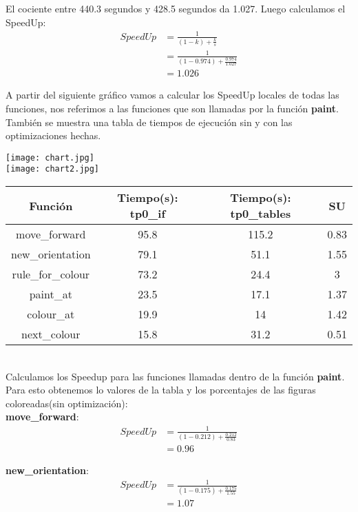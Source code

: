 \documentclass[a4paper, 10pt, twoside, notitlepage]{article}
\begin{document}
El cociente entre 440.3 segundos y 428.5 segundos da 1.027. Luego calculamos el SpeedUp:
\begin{equation*} 
\begin{split}
 SpeedUp & =\frac{1}{(1-k) + \frac{k}{s}} \\
  &=\frac{1}{(1-0.974) + \frac{0.974}{1.027}} \\
  &= 1.026
\end{split}
\end{equation*}


\newpage
A partir del siguiente gráfico vamos a calcular los SpeedUp locales de todas las funciones, nos referimos a las funciones que son llamadas por la función \textbf{paint}. También se muestra una tabla de tiempos de ejecución sin y con las optimizaciones hechas.

\texttt{[image: chart.jpg]} \\

\texttt{[image: chart2.jpg]} \\

\begin{tabular}{|c|c|c|c|}
\hline 
Función & Tiempo(s): tp0\_if & Tiempo(s): tp0\_tables & SU \\ 
\hline 
move\_forward & 95.8 & 115.2 & 0.83\\ 
\hline 
new\_orientation & 79.1 & 51.1 & 1.55\\ 
\hline 
rule\_for\_colour & 73.2 & 24.4 & 3 \\ 
\hline 
paint\_at & 23.5 & 17.1 & 1.37\\ 
\hline 
colour\_at & 19.9 & 14 & 1.42\\ 
\hline 
next\_colour & 15.8 & 31.2 & 0.51 \\ 
\hline 
\end{tabular} \\
 
 Calculamos los Speedup para las funciones llamadas dentro de la función \textbf{paint}. Para esto obtenemos lo valores de la tabla y los porcentajes de las figuras coloreadas(sin optimización):\\
 
\textbf{move\_forward}:
\begin{equation*} 
\begin{split}
 SpeedUp & =\frac{1}{(1-0.212) + \frac{0.212}{0.83}} \\
  &= 0.96
\end{split}
\end{equation*}

\textbf{new\_orientation}:
\begin{equation*} 
\begin{split}
 SpeedUp &=\frac{1}{(1-0.175) + \frac{0.175}{1.55}} \\
  &= 1.07
\end{split}
\end{equation*}
\end{document}
